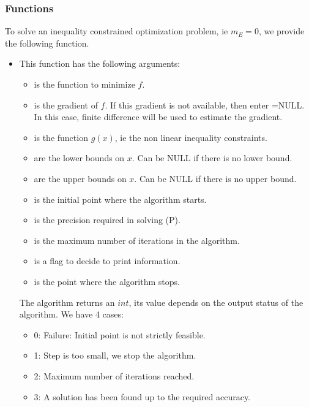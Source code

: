 \subsubsection{Functions}

To solve an inequality constrained optimization problem, ie $m_E=0$, we provide the following function.
\begin{itemize}
\item {}
  \sshortdescribe This function has the following arguments:

  \begin{itemize}
  \item {} is the function to minimize $f$.
  \item {} is the gradient of $f$. If this gradient is not available, then enter =NULL. In this case, finite difference will be used to estimate the gradient.
  \item {} is the function $g(x)$, ie the non linear inequality constraints.
  \item {} are the lower bounds on $x$. Can be NULL if there is no
    lower bound.
  \item {} are the upper bounds on $x$. Can be NULL if there is no
    upper bound.
  \item {} is the initial point where the algorithm starts.
  \item {} is the precision required in solving (P).
  \item {} is the maximum number of iterations in the algorithm.
  \item {} is a flag to decide to print information.
  \item {} is the point where the algorithm stops.
  \end{itemize}

  The algorithm returns an $int$, its value depends on the output status of the algorithm. We have 4 cases:
  \begin{itemize}
  \item 0: Failure: Initial point is not strictly feasible.
  \item 1: Step is too small, we stop the algorithm.
  \item 2: Maximum number of iterations reached.
  \item 3: A solution has been found up to the required accuracy.
  \end{itemize}


\end{itemize}
